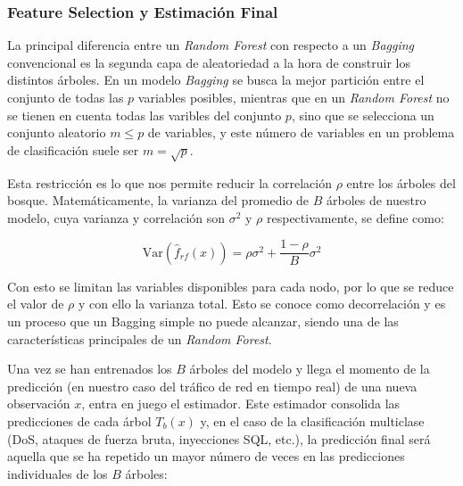 \documentclass[12pt]{article}
\numberwithin{equation}{section} %
\begin{document}
    \vspace{5mm}

    \subsubsection{Feature Selection y Estimación Final}

    \vspace{5mm}

    La principal diferencia entre un \textit{Random Forest} con respecto a un \textit{Bagging} convencional es la segunda capa de aleatoriedad a la hora de construir los distintos árboles. En un modelo \textit{Bagging} se busca la mejor partición entre el conjunto de todas las $p$ variables posibles, mientras que en un \textit{Random Forest} no se tienen en cuenta todas las varibles del conjunto $p$, sino que se selecciona un conjunto aleatorio $m \le p$ de variables, y este número de variables en un problema de clasificación suele ser $m = \sqrt{p}$. 

    \vspace{5mm}

    Esta restricción es lo que nos permite reducir la correlación $\rho$ entre los árboles del bosque. Matemáticamente, la varianza del promedio de $B$ árboles de nuestro modelo, cuya varianza y correlación son $\sigma^2$ y $\rho$ respectivamente, se define como:

    \vspace{2.5mm}

    \begin{equation}
    \text{Var}(\hat{f}_{rf}(x)) = \rho \sigma^2 + \frac{1-\rho}{B} \sigma^2
    \end{equation}

    \vspace{2.5mm}

    Con esto se limitan las variables disponibles para cada nodo, por lo que se reduce el valor de $\rho$ y con ello la varianza total. Esto se conoce como decorrelación y es un proceso que un Bagging simple no puede alcanzar, siendo una de las características principales de un \textit{Random Forest}.
    
    \vspace{5mm}

    Una vez se han entrenados los $B$ árboles del modelo y llega el momento de la predicción (en nuestro caso del tráfico de red en tiempo real) de una nueva observación $x$, entra en juego el estimador. Este estimador consolida las predicciones de cada árbol $T_b(x)$ y, en el caso de la clasificación multiclase (DoS, ataques de fuerza bruta, inyecciones SQL, etc.), la predicción final será aquella que se ha repetido un mayor número de veces en las predicciones individuales de los $B$ árboles:
\end{document}
